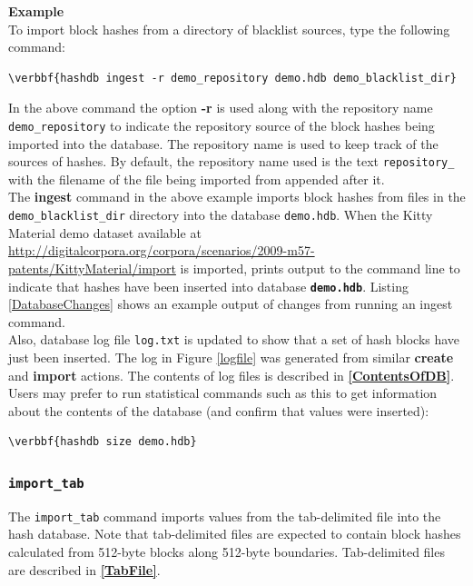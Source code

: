 \documentclass[11pt,fleqn]{article} %
\begin{document}
\textbf{Example}\\
To import block hashes from a directory of blacklist sources, type the following command:
\begin{Verbatim}[commandchars=\\\{\}]
\verbbf{hashdb ingest -r demo_repository demo.hdb demo_blacklist_dir}
\end{Verbatim}
In the above command the option \textbf{-r} is used along with the repository name \texttt{demo\_repository} to indicate the repository source of the block hashes being imported into the database. The repository name is used to keep track of the sources of hashes. By default, the repository name used is the text \texttt{repository\_} with the filename of the file being imported from appended after it.\\

The \textbf{ingest} command in the above example imports block hashes from files in the \texttt{demo\_blacklist\_dir} directory into the database \texttt{demo.hdb}. When the Kitty Material demo dataset available at \url{http://digitalcorpora.org/corpora/scenarios/2009-m57-patents/KittyMaterial/import} is imported, \hdb prints output to the command line to indicate that hashes have been inserted into database \texttt{\textbf{demo.hdb}}. Listing \ref{DatabaseChanges} shows an example output of changes from running an ingest command.\\

Also, database log file \texttt{log.txt} is updated to show that a set of hash blocks have just been inserted. The log in Figure \ref{logfile} was generated from similar \textbf{create} and \textbf{import} actions.  The contents of log files is described in \textbf{\autoref{ContentsOfDB}}.\\

Users may prefer to run statistical commands such as this to get information about the contents of the database (and confirm that values were inserted):
\begin{Verbatim}[commandchars=\\\{\}]
\verbbf{hashdb size demo.hdb}
\end{Verbatim}

\subsubsection{\texttt{import\_tab}}
The \verb+import_tab+ command imports values from the tab-delimited file into the hash database. Note that tab-delimited files are expected to contain block hashes calculated from 512-byte blocks along 512-byte boundaries. Tab-delimited files are described in \textbf{\autoref{TabFile}}.\\
\end{document}
